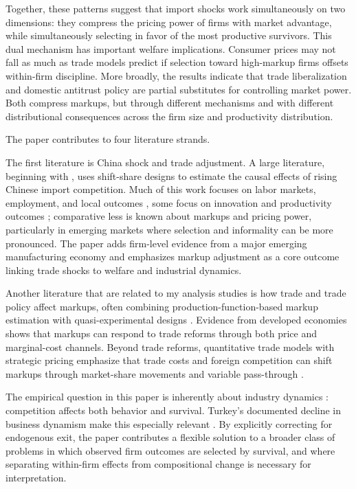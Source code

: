 \documentclass[12pt]{article}
\begin{document}
Together, these patterns suggest that import shocks work simultaneously on two dimensions: they compress the pricing power of firms with market advantage, while simultaneously selecting in favor of the most productive survivors. This dual mechanism has important welfare implications. Consumer prices may not fall as much as trade models predict if selection toward high-markup firms offsets within-firm discipline. More broadly, the results indicate that trade liberalization and domestic antitrust policy are partial substitutes for controlling market power. Both compress markups, but through different mechanisms and with different distributional consequences across the firm size and productivity distribution.

The paper contributes to four literature strands.

The first literature is China shock and trade adjustment. A large literature, beginning with \autocite{autorChinaSyndromeLocal2013}, uses shift-share designs to estimate the causal effects of rising Chinese import competition. Much of this work focuses on labor markets, employment, and local outcomes \parencite{acemogluImportCompetitionGreat2016,pierceSurprisinglySwiftDecline2016}, some focus on innovation and productivity outcomes \parencite{aghionOpposingFirmLevelResponses2024,autorFallLaborShare2020, bloomTradeInducedTechnical2016}; comparative less is known about markups and pricing power, particularly in emerging markets where selection and informality can be more pronounced. The paper adds firm-level evidence from a major emerging manufacturing economy and emphasizes markup adjustment as a core outcome linking trade shocks to welfare and industrial dynamics.

Another literature that are related to my analysis studies is how trade and trade policy affect markups, often combining production-function-based markup estimation with quasi-experimental designs \parencite{deloeckerPricesMarkupsTrade2016}. Evidence from developed economies shows that markups can respond to trade reforms through both price and marginal-cost channels. Beyond trade reforms, quantitative trade models with strategic pricing emphasize that trade costs and foreign competition can shift markups through market-share movements and variable pass-through \parencite{edmondCompetitionMarkupsGains2015,atkesonPricingtoMarketTradeCosts2008}.

The empirical question in this paper is inherently about industry dynamics \parencite{melitzImpactTradeIntraIndustry2003,ericsonMarkovPerfectIndustryDynamics1995,hopenhaynEntryExitFirm1992}: competition affects both behavior and survival. Turkey's documented decline in business dynamism make this especially relevant \parencite{akcigitFactsBusinessDynamism2020}. By explicitly correcting for endogenous exit, the paper contributes a flexible solution to a broader class of problems in which observed firm outcomes are selected by survival, and where separating within-firm effects from compositional change is necessary for interpretation. 
\end{document}

